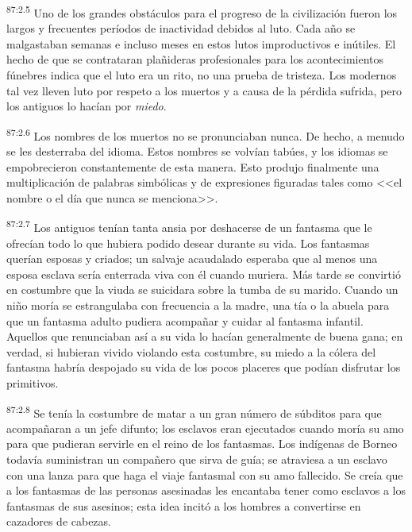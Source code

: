 \par
\textsuperscript{87:2.5} Uno de los grandes obstáculos para el progreso de la civilización fueron los largos y frecuentes períodos de inactividad debidos al luto. Cada año se malgastaban semanas e incluso meses en estos lutos improductivos e inútiles. El hecho de que se contrataran plañideras profesionales para los acontecimientos fúnebres indica que el luto era un rito, no una prueba de tristeza. Los modernos tal vez lleven luto por respeto a los muertos y a causa de la pérdida sufrida, pero los antiguos lo hacían por \textit{miedo}.

\par
\textsuperscript{87:2.6} Los nombres de los muertos no se pronunciaban nunca. De hecho, a menudo se les desterraba del idioma. Estos nombres se volvían tabúes, y los idiomas se empobrecieron constantemente de esta manera. Esto produjo finalmente una multiplicación de palabras simbólicas y de expresiones figuradas tales como <<el nombre o el día que nunca se menciona>>.

\par
\textsuperscript{87:2.7} Los antiguos tenían tanta ansia por deshacerse de un fantasma que le ofrecían todo lo que hubiera podido desear durante su vida. Los fantasmas querían esposas y criados; un salvaje acaudalado esperaba que al menos una esposa esclava sería enterrada viva con él cuando muriera. Más tarde se convirtió en costumbre que la viuda se suicidara sobre la tumba de su marido. Cuando un niño moría se estrangulaba con frecuencia a la madre, una tía o la abuela para que un fantasma adulto pudiera acompañar y cuidar al fantasma infantil. Aquellos que renunciaban así a su vida lo hacían generalmente de buena gana; en verdad, si hubieran vivido violando esta costumbre, su miedo a la cólera del fantasma habría despojado su vida de los pocos placeres que podían disfrutar los primitivos.

\par
\textsuperscript{87:2.8} Se tenía la costumbre de matar a un gran número de súbditos para que acompañaran a un jefe difunto; los esclavos eran ejecutados cuando moría su amo para que pudieran servirle en el reino de los fantasmas. Los indígenas de Borneo todavía suministran un compañero que sirva de guía; se atraviesa a un esclavo con una lanza para que haga el viaje fantasmal con su amo fallecido. Se creía que a los fantasmas de las personas asesinadas les encantaba tener como esclavos a los fantasmas de sus asesinos; esta idea incitó a los hombres a convertirse en cazadores de cabezas.

